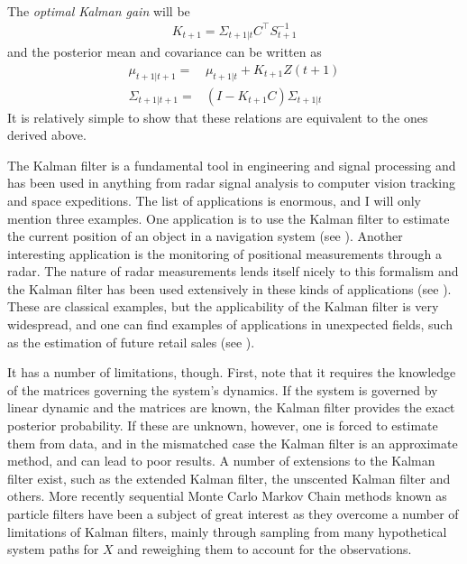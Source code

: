 {\begin{eqnarray*}
\end{eqnarray*}
The \emph{optimal Kalman gain} will be
\begin{eqnarray*}
K_{t+1} = \Sigma_{t+1|t} C^\top S_{t+1}^{-1}
\end{eqnarray*}
and the posterior mean and covariance can be written as
\begin{eqnarray*}
\mu_{t+1|t+1} =& \mu_{t+1|t} + K_{t+1} Z({t+1})\\
\Sigma_{t+1|t+1} =& \left(I-K_{t+1} C\right) \Sigma_{t+1|t}
\end{eqnarray*}
It is relatively simple to show that these relations are equivalent to the ones derived above.\par
The Kalman filter is a fundamental tool in engineering and signal processing and has been used in anything from radar signal analysis to computer vision tracking and 
space expeditions. The list of applications is enormous, and I will only mention three examples. One application is to use the Kalman filter to estimate the current 
position of an object in a navigation system (see ). Another interesting application is the monitoring of positional measurements through a radar. 
The nature of radar measurements lends itself nicely to this formalism and the Kalman filter has been used extensively in these kinds of applications (see 
). These are classical examples, but the applicability of the Kalman filter is very widespread, and one can find examples of applications in unexpected 
fields, such as the estimation of future retail sales (see ).\par
It has a number of limitations, though. First, note that it requires the knowledge
of the matrices governing the system's dynamics. If the system is governed by linear dynamic and the matrices are known, the Kalman filter provides the exact posterior 
probability. If these are unknown, however, one is forced to estimate them from data, and in the mismatched case the Kalman 
filter is an approximate method, and can lead to poor results. A number of extensions to the Kalman filter exist, such as the 
extended Kalman filter, the unscented Kalman filter and others. More recently sequential Monte Carlo Markov Chain methods known as particle filters have been a 
subject of great interest as they overcome a number of limitations of Kalman filters, mainly through sampling from many hypothetical system paths for $X$ and
reweighing them to account for the observations.


}
